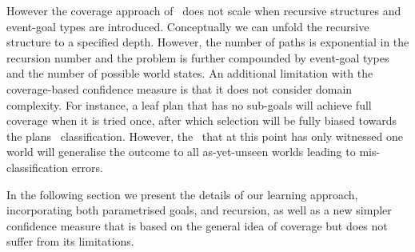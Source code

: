 
However the coverage approach of~\cite{Singh:AAMAS10} does not scale
when recursive structures and event-goal types are
introduced. Conceptually we can unfold the recursive structure to a
specified depth. However, the number of paths is exponential in the
recursion number and the problem is further compounded by event-goal
types and the number of possible world states.
%
An additional limitation with the
coverage-based confidence measure is that it does not consider domain
complexity. For instance, a leaf plan that has no sub-goals will
achieve full coverage when it is tried once, after which selection
will be fully biased towards the plans \dt\ classification. However,
the \dt\ that at this point has only witnessed one world will
generalise the outcome to all as-yet-unseen worlds leading to
mis-classification errors. 

In the following section we present the details of our learning
approach, incorporating both parametrised goals, and recursion, as
well as a new simpler confidence measure that is based on the 
general idea of coverage but does not suffer from its limitations.








